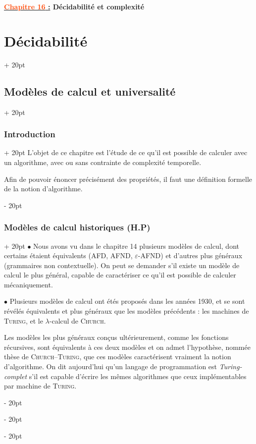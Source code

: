 \documentclass[a4paper, 12pt, twoside]{article}
\newcommand{\Emph}{\textcolor{ff4500}}
\newcommand{\ind}[1][20pt]{\advance\leftskip + #1}
\newcommand{\deind}[1][20pt]{\advance\leftskip - #1}
\newenvironment{indt}[2][20pt]{#2 \par \ind[#1]}{\par \deind} %
\newcommand{\thetitle}[2]{\begin{center}\textbf{{\LARGE \underline{\Emph{#1} :}} {\Large #2}}\end{center}}
\begin{document}
    
    \thetitle{Chapitre 16}{Décidabilité et complexité}
    
    \tableofcontents
    \newpage
    
    \begin{indt}{\section{Décidabilité}}
        \begin{indt}{\subsection{Modèles de calcul et universalité}}
            \begin{indt}{\subsubsection{Introduction}}
                L'objet de ce chapitre est l'étude de ce qu'il est possible de calculer avec un algorithme, avec ou sans contrainte de complexité temporelle.

                Afin de pouvoir énoncer précisément des propriétés, il faut une définition formelle de la notion d'algorithme.
            \end{indt}

            \begin{indt}{\subsubsection{Modèles de calcul historiques (H.P)}}
                $\bullet$ Nous avons vu dans le chapitre 14 plusieurs modèles de calcul, dont certains étaient équivalents (AFD, AFND, $\varepsilon$-AFND) et d'autres plus généraux (grammaires non contextuelle).
                On peut se demander s'il existe un modèle de calcul le plus général, capable de caractériser ce qu'il est possible de calculer mécaniquement.

                $\bullet$ Plusieurs modèles de calcul ont étés proposés dans les années 1930, et se sont révélés équivalents et plus généraux que les modèles précédents : les machines de \textsc{Turing}, et le $\lambda$-calcul de \textsc{Church}.

                Les modèles les plus généraux conçus ultérieurement, comme les fonctions récursives, sont équivalents à ces deux modèles et on admet l'hypothèse, nommée thèse de \textsc{Church}--\textsc{Turing}, que ces modèles caractérisent vraiment la notion d'algorithme.
                On dit aujourd'hui qu'un langage de programmation est \emph{Turing-complet} s'il est capable d'écrire les mêmes algorithmes que ceux implémentables par machine de \textsc{Turing}.


\end{indt}
\end{indt}
\end{indt}
\end{document}
